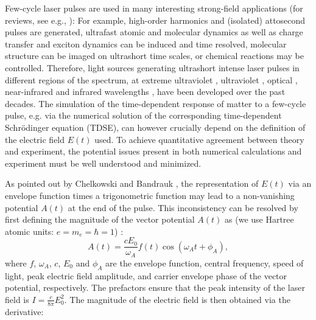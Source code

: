 Few-cycle laser pulses are used in many interesting strong-field applications (for reviews, see e.g., \cite{popmintchev10,suzuki14,vrakking14,pazourek15,wang15,xu16}): For example, high-order harmonics and (isolated) attosecond pulses are generated, ultrafast atomic and molecular dynamics as well as charge transfer and exciton dynamics can be induced and time resolved, molecular structure can be imaged on ultrashort time scales, or chemical reactions may be controlled. Therefore, light sources generating ultrashort intense laser pulses in different regions of the spectrum, at extreme ultraviolet \cite{goulielmakis08}, ultraviolet \cite{durfee99}, optical \cite{fork87}, near-infrared \cite{zhou94,nisoli96,nisoli97} and infrared wavelengths \cite{ishii14,pupeza15,li16}, have been developed over the past decades.  The simulation of the time-dependent response of matter to a few-cycle pulse, e.g. via the numerical solution of the corresponding time-dependent Schr\"odinger equation (TDSE), can however crucially depend on the definition of the electric field $E(t)$ used. To achieve quantitative agreement between theory and experiment, the potential issues present in both numerical calculations and experiment must be well understood and minimized.

As pointed out by Chelkowski and Bandrauk \cite{chelkowski02}, the representation of $E(t)$ via an envelope function times a trigonometric function may lead to a non-vanishing potential $A(t)$ at the end of the pulse. This inconsistency can be resolved by first defining the magnitude of the vector potential $A(t)$ as (we use Hartree atomic units: $e = m_e = \hbar =1$) \cite{chelkowski02}: 
\begin{equation}
A(t) = \frac{c E_0}{\omega_A}f(t) \cos(\omega_A t +\phi_A),
\label{eq:vectorpotential}
\end{equation}
where $f$, $\omega_A$, $c$, $E_0$ and $\phi_A$ are the envelope function, central frequency, speed of light, peak electric field amplitude, and carrier envelope phase of the vector potential, respectively.
The prefactors ensure that the peak intensity of the laser field is $I = \tfrac{c}{8\pi}E_0^2$.
The magnitude of the electric field is then obtained via the derivative:

